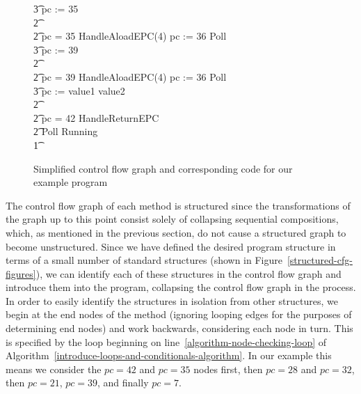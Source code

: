 \begin{figure}
\begin{center}
\begin{minipage}{0.6\linewidth}
\begin{circus}
        \t3 pc := 35 \\
        \t2 {} \cdots {} \\
        \t2 {} \circelse pc = 35 \circthen HandleAloadEPC(4) \circseq pc := 36 \circseq Poll \circseq \cdots \circseq \\
        \t3 pc := 39 \\
        \t2 {} \cdots {} \\
        \t2 {} \circelse pc = 39 \circthen HandleAloadEPC(4) \circseq pc := 36 \circseq Poll \circseq \cdots \circseq \\
        \t3 pc := \IF value1 \leq value2   \\
        \t2 {} \cdots {} \\
        \t2 {} \circelse pc = 42 \circthen HandleReturnEPC \\
        \t2 \circfi \circseq Poll \circseq Running \\
        \t1 \circfi
      \end{circus}
    \end{minipage}
  \end{center}
  \caption{Simplified control flow graph and corresponding code for our example
    program}
  \label{example-simplified-control-flow-graph-figure}
\end{figure}


The control flow graph of each method is structured since the
transformations of the graph up to this point consist solely of
collapsing sequential compositions, which, as mentioned in the
previous section, do not cause a structured graph to become
unstructured.
Since we have defined the desired program structure in terms of a
small number of standard structures (shown in
Figure~\ref{structured-cfg-figures}), we can identify each of these
structures in the control flow graph and introduce them into the
program, collapsing the control flow graph in the process.
In order to easily identify the structures in isolation from other
structures, we begin at the end nodes of the method (ignoring looping
edges for the purposes of determining end nodes) and work backwards,
considering each node in turn.
This is specified by the loop beginning on
line~\ref{algorithm-node-checking-loop} of
Algorithm~\ref{introduce-loops-and-conditionals-algorithm}.
In our example this means we consider the $pc=42$ and $pc=35$ nodes
first, then $pc=28$ and $pc=32$, then $pc=21$, $pc=39$, and finally
$pc=7$.


